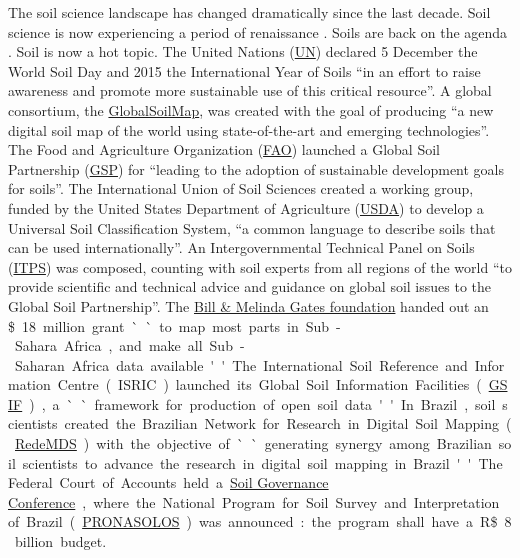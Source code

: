 The soil science landscape has changed dramatically since the last decade. Soil science is now 
experiencing a period of renaissance \citep{HarteminkEtAl2008}. Soils are back on the agenda 
\citep{Kempen2011}. Soil is now a hot topic. The United Nations 
(\href{http://www.un.org/apps/news/story.asp?NewsID=49520#.VnremV6alz0}{UN}) declared 5 December 
the World Soil Day and 2015 the International Year of Soils ``in an effort to raise awareness and 
promote more sustainable use of this critical resource''. A global consortium, the 
\href{http://www.globalsoilmap.net/}{GlobalSoilMap}, was created with the goal of producing ``a 
new digital soil map of the world using state-of-the-art and emerging technologies''. The Food and 
Agriculture Organization (\href{http://www.fao.org/index_en.htm}{FAO}) launched a Global Soil 
Partnership (\href{http://www.fao.org/globalsoilpartnership/}{GSP}) for ``leading to the adoption
of sustainable development goals for soils''. The International Union of Soil Sciences created a 
working group, funded by the United States Department of Agriculture 
(\href{http://www.nrcs.usda.gov/wps/portal/nrcs/main/soils/survey/class/}{USDA}) to develop a 
Universal Soil Classification System, ``a common language to describe soils that can be used 
internationally''. An Intergovernmental Technical Panel on Soils 
(\href{http://www.fao.org/globalsoilpartnership/intergovernmental-technical-panel-on-soils/}{ITPS})
was composed, counting with soil experts from all regions of the world ``to provide scientific and 
technical advice and guidance on global soil issues to the Global Soil Partnership''. The 
\href{http://www.gatesfoundation.org/what-we-do/global-development/agricultural-development}{Bill 
\& Melinda Gates foundation} handed out an \SI{18}[\$]~million grant ``to map most parts in 
Sub-Sahara Africa, and make all Sub-Saharan Africa data available''. The International Soil 
Reference and Information Centre (ISRIC) launched its Global Soil Information Facilities 
(\href{http://www.isric.org/projects/global-soil-information-facilities-gsif}{GSIF}), a ``framework 
for production of open soil data''. In Brazil, soil scientists created the Brazilian Network for 
Research in Digital Soil Mapping (\href{https://goo.gl/m8QWUm}{RedeMDS}) with the objective of 
``generating synergy among Brazilian soil scientists to advance the research in digital soil mapping
in Brazil''. The Federal Court of Accounts held a \href{www.governancadosolo.gov.br/}{Soil 
Governance Conference}, where the National Program for Soil Survey and Interpretation of Brazil 
(\href{https://goo.gl/zbMK24}{PRONASOLOS}) was announced: the program shall have a 
\SI{8}[R\$]~billion budget.

